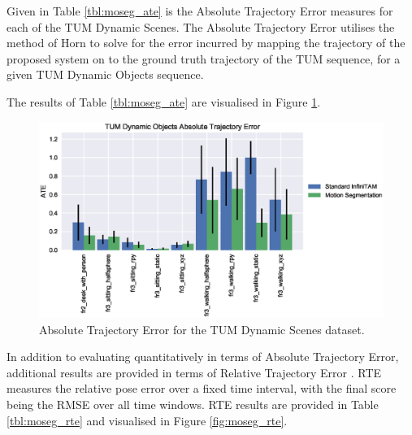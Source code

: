 Given in Table \ref{tbl:moseg_ate} is the Absolute Trajectory Error measures
for each of the TUM Dynamic Scenes. The Absolute Trajectory Error utilises the
method of Horn \cite{Horn1987} to solve for the error incurred by mapping the
trajectory of the proposed system on to the ground truth trajectory of the TUM
sequence, for a given TUM Dynamic Objects sequence.

The results of Table \ref{tbl:moseg_ate} are visualised in Figure
\ref{fig:moseg_ate}.

\begin{figure}[ht]
  \label{fig:moseg_ate}
  \centering
  \includegraphics[width=\linewidth]{figures/moseg/ate.eps}
  \caption[Motion Segmentation ATE]
  {Absolute Trajectory Error for the TUM Dynamic Scenes dataset.}
\end{figure}

In addition to evaluating quantitatively in terms of Absolute Trajectory Error,
additional results are provided in terms of Relative Trajectory Error
\cite{Sturm2012}. RTE measures the relative pose error over a fixed time
interval, with the final score being the RMSE over all time windows. RTE results
are provided in Table \ref{tbl:moseg_rte} and visualised in Figure
\ref{fig:moseg_rte}.

